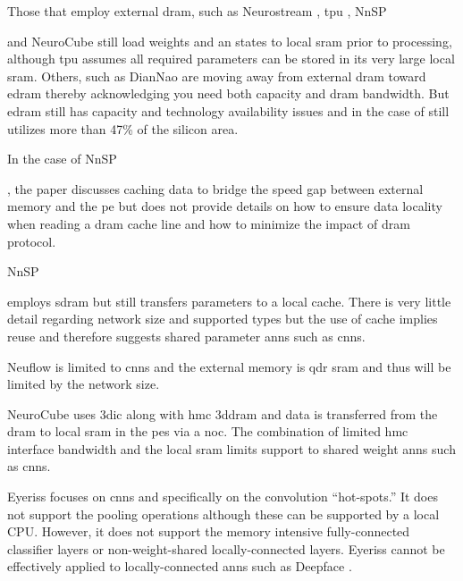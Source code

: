 Those that employ external \ac{dram}, such as Neurostream \cite{azarkhish2017neurostream}, \ac{tpu} \cite{tensorflow2015-whitepaper}, NnSP{\cite{esmaeilzadeh2005nnsp} and NeuroCube\cite{kim2016neurocube} still 
load weights and \ac{an} states to local \ac{sram} prior to processing, although \ac{tpu} assumes all required parameters can be stored in its very large local \ac{sram}.
Others, such as DianNao \cite{chen2016diannao} are moving away from external \ac{dram} toward \ac{edram} thereby acknowledging you need both capacity and \ac{dram} bandwidth. 
But \ac{edram} still has capacity and technology availability issues and in the case of \cite{dadiannao2017} still utilizes more than 47\% of the silicon area.

In the case of NnSP{\cite{esmaeilzadeh2005nnsp}, the paper discusses caching data to bridge the speed gap between external memory and the \ac{pe} 
but does not provide details on how to ensure data locality when reading a \ac{dram} cache line and how to minimize the impact of \ac{dram} protocol.

NnSP {\cite{esmaeilzadeh2005nnsp} employs \ac{sdram} but still transfers parameters to a local cache.
There is very little detail regarding network size and supported types but the use of cache implies reuse and therefore suggests shared parameter \acp{ann} such as \acp{cnn}.

Neuflow\cite{farabet2011neuflow} is limited to \acp{cnn} and the external memory is \ac{qdr} \ac{sram} 
and thus will be limited by the network size.

NeuroCube uses \ac{3dic} along with \ac{hmc} \ac{3ddram} and data is transferred from the \ac{dram} to local \ac{sram} in the \acp{pe} via a \ac{noc}.
The combination of limited \ac{hmc} interface bandwidth and the local \ac{sram} limits support to shared weight \acp{ann} such as \acp{cnn}.

Eyeriss\cite{chen201614} focuses on \acp{cnn} and specifically on the convolution ``hot-spots.''  It does not support the pooling operations although these can
be supported by a local CPU.  However, it does not support the memory intensive fully-connected classifier layers or non-weight-shared locally-connected layers.
Eyeriss cannot be effectively applied to locally-connected \acp{ann} such as Deepface \cite{Taigman_2014_CVPR}.

}}}
